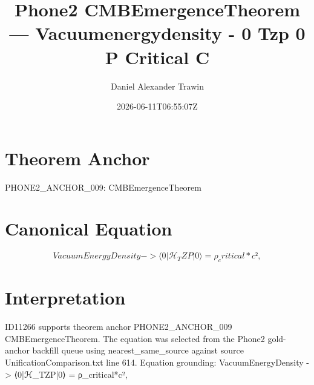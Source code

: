 \documentclass[11pt]{article}
\title{Phone2 CMBEmergenceTheorem — Vacuumenergydensity - 0 Tzp 0 Ρ Critical C}
\author{Daniel Alexander Trawin}
\date{2026-06-11T06:55:07Z}
\begin{document}
\maketitle
\section*{Theorem Anchor}
PHONE2_ANCHOR_009: CMBEmergenceTheorem
\section*{Canonical Equation}
\[
VacuumEnergyDensity -> ⟨0|ℋ_TZP|0⟩ = ρ_critical*c²,
\]
\section*{Interpretation}
ID11266 supports theorem anchor PHONE2_ANCHOR_009 CMBEmergenceTheorem. The equation was selected from the Phone2 gold-anchor backfill queue using nearest_same_source against source UnificationComparison.txt line 614. Equation grounding: VacuumEnergyDensity -> ⟨0|ℋ_TZP|0⟩ = ρ_critical*c²,
\end{document}
